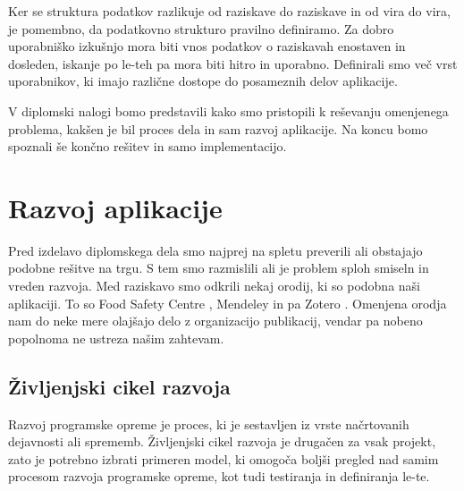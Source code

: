 \documentclass[a4paper, 12pt]{book}
\begin{document}
Ker se struktura podatkov razlikuje od raziskave do raziskave in od vira do vira, je pomembno, da podatkovno strukturo pravilno definiramo. Za dobro uporabniško izkušnjo mora biti vnos podatkov o raziskavah enostaven in dosleden, iskanje po le-teh pa mora biti hitro in uporabno. Definirali smo več vrst uporabnikov, ki imajo različne dostope do posameznih delov aplikacije.

V diplomski nalogi bomo predstavili kako smo pristopili k reševanju omenjenega problema, kakšen je bil proces dela in sam razvoj aplikacije. Na koncu bomo spoznali še končno rešitev in samo implementacijo.






\chapter{Razvoj aplikacije}
\label{pregled-podrocja-chapter}

Pred izdelavo diplomskega dela smo najprej na spletu preverili ali obstajajo podobne rešitve na trgu. S tem smo razmislili ali je problem sploh smiseln in vreden razvoja. Med raziskavo smo odkrili nekaj orodij, ki so podobna naši aplikaciji. To so Food Safety Centre \cite{food-safety-centre}, Mendeley \cite{mendeley-manager} in pa Zotero \cite{zotero-manager}. Omenjena orodja nam do neke mere olajšajo delo z organizacijo publikacij, vendar pa nobeno popolnoma ne ustreza našim zahtevam.


\section{Življenjski cikel razvoja }
Razvoj programske opreme je proces, ki je sestavljen iz vrste načrtovanih dejavnosti ali sprememb. Življenjski cikel razvoja je drugačen za vsak projekt, zato je potrebno izbrati primeren model, ki omogoča boljši pregled nad samim procesom razvoja programske opreme, kot tudi testiranja in definiranja le-te.
\end{document}
